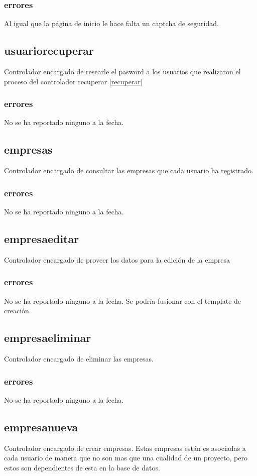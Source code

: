 \documentclass[10pt,a4paper]{book}
\begin{document}
	\subsubsection{errores}
	Al igual que la página de inicio le hace falta un captcha de seguridad.

	\subsection{usuariorecuperar}
	Controlador encargado de researle el pasword a los usuarios que realizaron el proceso del controlador  recuperar \ref{recuperar}
	\subsubsection{errores}
	No se ha reportado ninguno a la fecha.

	\subsection{empresas}
	Controlador encargado de consultar las empresas que cada usuario ha registrado.
	\subsubsection{errores}
	No se ha reportado ninguno a la fecha.

	\subsection{empresaeditar}
	Controlador encargado de proveer los datos para la edición de la empresa
	\subsubsection{errores}
	No se ha reportado ninguno a la fecha. Se podría fusionar con el template de creación.

	\subsection{empresaeliminar}
	Controlador encargado de eliminar las empresas.
	\subsubsection{errores}
	No se ha reportado ninguno a la fecha.

	\subsection{empresanueva}
	Controlador encargado de crear empresas. Estas empresas están es asociadas a cada usuario de manera que no son mas que una cualidad de un proyecto, pero estos son dependientes de esta en la base de datos.
\end{document}
